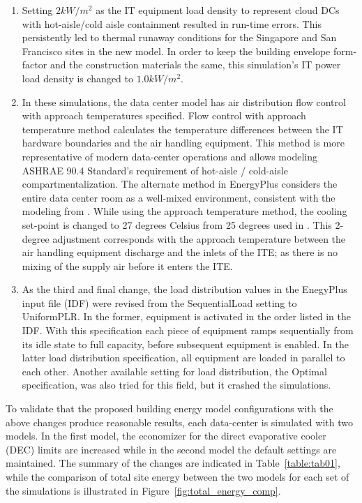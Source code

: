 \begin{enumerate}
\item Setting $2kW/m^2$ as the IT equipment load density to represent cloud DCs with hot-aisle/cold aisle containment resulted in run-time errors. This persistently led to thermal runaway conditions for the Singapore and San Francisco sites in the new model. In order to keep the building envelope form-factor and the construction materials the same, this simulation’s IT power load density is changed to $1.0kW/m^2$.
\item In these simulations, the data center model has air distribution flow control with approach temperatures specified. Flow control with approach temperature method calculates the temperature differences between the IT hardware boundaries and the air handling equipment.  This method is more representative of modern data-center operations and allows modeling ASHRAE 90.4 Standard’s requirement of hot-aisle / cold-aisle compartmentalization. The alternate method in EnergyPlus considers the entire data center room as a well-mixed environment, consistent with the modeling from \citep{kumar20}. While using the approach temperature method, the cooling set-point is changed to 27 degrees Celsius from 25 degrees used in \citep{kumar20}. This 2-degree adjustment corresponds with the approach temperature between the air handling equipment discharge and the inlets of the ITE; as there is no mixing of the supply air before it enters the ITE. 
\item As the third and final change, the load distribution values in the EnegyPlus input file (IDF) were revised from the SequentialLoad setting to UniformPLR. In the former, equipment is activated in the order listed in the IDF. With this specification each piece of equipment ramps sequentially from its idle state to full capacity, before subsequent equipment is enabled. In the latter load distribution specification, all equipment are loaded in parallel to each other. Another available setting for load distribution, the Optimal specification, was also tried for this field, but it crashed the simulations.

\end{enumerate}

To validate that the proposed building energy model configurations with the above changes produce reasonable results, each data-center is simulated with two models. In the first model, the economizer for the direct evaporative cooler (DEC) limits are increased while in the second model the default settings are maintained. The summary of the changes are indicated in Table~\ref{table:tab01}, while the comparison of total site energy between the two models for each set of the simulations is illustrated in Figure~\ref{fig:total_energy_comp}. 

